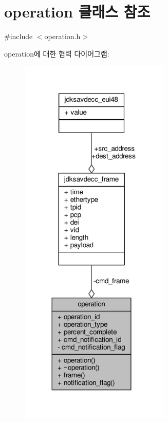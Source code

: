 \hypertarget{classavdecc__lib_1_1operation}{}\section{operation 클래스 참조}
\label{classavdecc__lib_1_1operation}


{\ttfamily \#include $<$operation.\+h$>$}



operation에 대한 협력 다이어그램\+:
\nopagebreak
\begin{figure}[H]
\begin{center}
\leavevmode
\includegraphics[width=203pt]{classavdecc__lib_1_1operation__coll__graph}
\end{center}
\end{figure}
